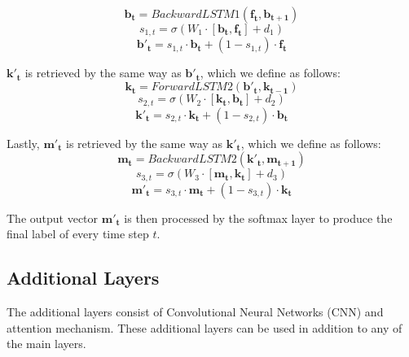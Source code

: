 \begin{equation}
\label{eq:backwardhighway1}
\mathbf{b_{t}} = BackwardLSTM1(\mathbf{f_{t}}, \mathbf{b_{t+1}})
\end{equation}
\begin{equation}
	s_{1,t} = \sigma(W_{1} \cdot [\mathbf{b_{t}}, \mathbf{f_{t}}] + d_{1})
\end{equation}
\begin{equation}
	\mathbf{b'_{t}} = s_{1,t} \cdot \mathbf{b_{t}} + (1 - s_{1,t}) \cdot \mathbf{f_{t}} 
\end{equation}

$\mathbf{k'_{t}}$ is retrieved by the same way as $\mathbf{b'_{t}}$, which we define as follows:
\begin{equation}
\label{eq:forwardhighway2}
\mathbf{k_{t}} = ForwardLSTM2(\mathbf{b'_{t}}, \mathbf{k_{t-1}})
\end{equation}
\begin{equation}
s_{2,t} = \sigma(W_{2} \cdot [\mathbf{k_{t}}, \mathbf{b_{t}}] + d_{2})
\end{equation}
\begin{equation}
\mathbf{k'_{t}} = s_{2,t} \cdot \mathbf{k_{t}} + (1 - s_{2,t}) \cdot \mathbf{b_{t}} 
\end{equation}

Lastly, $\mathbf{m'_{t}}$ is retrieved by the same way as $\mathbf{k'_{t}}$, which we define as follows:
\begin{equation}
\label{eq:backwardhighway2}
\mathbf{m_{t}} = BackwardLSTM2(\mathbf{k'_{t}}, \mathbf{m_{t+1}})
\end{equation}
\begin{equation}
s_{3,t} = \sigma(W_{3} \cdot [\mathbf{m_{t}}, \mathbf{k_{t}}] + d_{3})
\end{equation}
\begin{equation}
\mathbf{m'_{t}} = s_{3,t} \cdot \mathbf{m_{t}} + (1 - s_{3,t}) \cdot \mathbf{k_{t}} 
\end{equation}

The output vector $\mathbf{m'_{t}}$ is then processed by the softmax layer to produce the final label of every time step $t$.

\subsection{Additional Layers}
The additional layers consist of Convolutional Neural Networks (CNN) and attention mechanism. These additional layers can be used in addition to any of the main layers.

